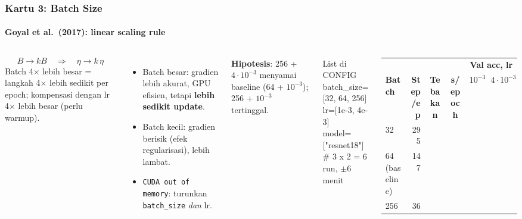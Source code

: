 \documentclass[t,aspectratio=169,xcolor={dvipsnames,table}]{beamer}
\begin{document}
\begin{frame}
    \frametitle{Kartu 3: Batch Size}
    \framesubtitle{Goyal et al.\ (2017): linear scaling rule}
    \footnotesize

    \begin{columns}[T]
        \[
            B \to kB \quad\Rightarrow\quad \eta \to k\,\eta
        \]
        {\scriptsize Batch 4$\times$ lebih besar = langkah 4$\times$ lebih sedikit per epoch; kompensasi dengan lr 4$\times$ lebih besar (perlu warmup).}
        \begin{itemize}
            \item Batch besar: gradien lebih akurat, GPU efisien, tetapi \textbf{lebih sedikit update}.
            \item Batch kecil: gradien berisik (efek regularisasi), lebih lambat.
            \item \texttt{CUDA out of memory}: turunkan \texttt{batch\_size} \emph{dan} lr.
        \end{itemize}
        \textbf{Hipotesis}: 256 + $4\cdot10^{-3}$ menyamai baseline (64 + $10^{-3}$); 256 + $10^{-3}$ tertinggal.

        \begin{block}{List di CONFIG}
            {\ttfamily\scriptsize batch\_size=[32, 64, 256]\\lr=[1e-3, 4e-3]\\model=["resnet18"]   \# 3 x 2 = 6 run, $\pm$6 menit}
        \end{block}
        \vspace{2pt}
        \scriptsize
        \setlength{\tabcolsep}{4pt}
        \renewcommand{\arraystretch}{1.5}
        \begin{tabular}{|l|r|c|c|c|c|}
            \rowcolor{dlSoftCloud} & & & & \multicolumn{2}{c|}{\textbf{Val acc, lr}} \\
            \rowcolor{dlSoftCloud} \textbf{Batch} & \textbf{Step/ep} & \textbf{Tebakan} & \textbf{s/epoch} & \textbf{$10^{-3}$} & \textbf{$4\cdot10^{-3}$} \\ \hline
            32 & 295 & \hspace{0.6cm} & \hspace{0.6cm} & \hspace{0.6cm} & \hspace{0.6cm} \\ \hline
            64 (baseline) & 147 & \hspace{0.6cm} & \hspace{0.6cm} & \hspace{0.6cm} & \hspace{0.6cm} \\ \hline
            256 & 36 & \hspace{0.6cm} & \hspace{0.6cm} & \hspace{0.6cm} & \hspace{0.6cm} \\ \hline
        \end{tabular}


\end{columns}
\end{frame}
\end{document}
